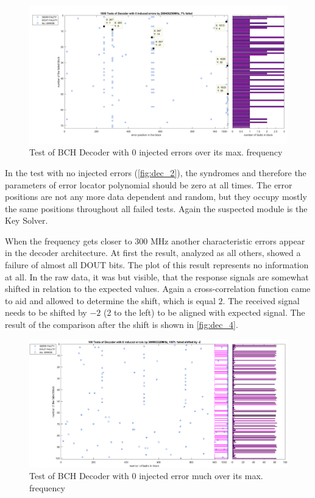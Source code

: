 \begin{figure}[h]
\centering
\includegraphics[width=\textwidth]{figures/1000_tests_0_faults_266_MHz_1.png}
\caption{Test of BCH Decoder with 0 injected errors over its max. frequency}
\label{fig:dec_2}
\end{figure}

In the test with no injected errors (\autoref{fig:dec_2}), the syndromes and therefore the parameters of error locator polynomial should be zero at all times. The error positions are not any more data dependent and random, but they occupy mostly the same positions throughout all failed tests. Again the suspected module is the Key Solver.

When the frequency gets closer to 300 MHz another characteristic errors appear in the decoder architecture. At first the result, analyzed as all others, showed a failure of almost all DOUT bits. The plot of this result represents no information at all. In the raw data, it was but visible, that the response signals are somewhat shifted in relation to the expected values. Again a cross-correlation function came to aid and allowed to determine the shift, which is equal $2$. The received signal needs to be shifted by $-2$ (2 to the left) to be aligned with expected signal. The result of the comparison after the shift is shown in \autoref{fig:dec_4}. 

\begin{figure}[h]
\centering
\includegraphics[width=\textwidth]{figures/100_tests_0_faults_300_MHz_shift_2.png}
\caption{Test of BCH Decoder with 0 injected error much over its max. frequency}
\label{fig:dec_4}
\end{figure}

